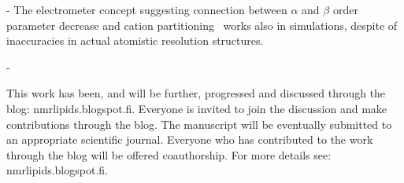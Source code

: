 \documentclass[pre,aps,floatfix,authordate1-4,twocolumn]{revtex4-1}
\begin{document}
- The electrometer concept suggesting connection between $\alpha$ and $\beta$ order parameter decrease and
cation partitioning~\cite{akutsu81,altenbach84,seelig87,scherer89} works also in simulations, despite of inaccuracies in actual atomistic resolution structures. 


-  











This work has been, and will be further, progressed and discussed through the blog: nmrlipids.blogspot.fi. 
Everyone is invited to join the discussion and make contributions through the blog. 
The manuscript will be eventually submitted to an appropriate scientific journal. 
Everyone who has contributed to the work through the blog will be offered 
coauthorship. For more details see: nmrlipids.blogspot.fi.   
\end{document}
